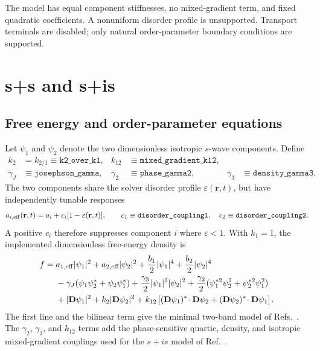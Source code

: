 \documentclass[11pt]{article}
\begin{document}
The model has equal component stiffnesses, no mixed-gradient term, and fixed
quadratic coefficients.  A nonuniform disorder profile is unsupported.
Transport terminals are disabled; only natural order-parameter boundary
conditions are supported.

\section{s+s and s+is \cite{Zhitomirsky2004,Kogan2011,Lin2016}}

\subsection{Free energy and order-parameter equations}

Let $\psi_1$ and $\psi_2$ denote the two dimensionless isotropic $s$-wave
components.  Define
\begin{align}
  k_2&=k_{2/1}\equiv\texttt{k2\_over\_k1},&
  k_{12}&\equiv\texttt{mixed\_gradient\_k12},\\
  \gamma_J&\equiv\texttt{josephson\_gamma},&
  \gamma_2&\equiv\texttt{phase\_gamma2},&
  \gamma_3&\equiv\texttt{density\_gamma3}.
\end{align}
The two components share the solver disorder profile $\varepsilon(\mathbf r,t)$,
but have independently tunable responses
\begin{equation}
  a_{i,{\rm eff}}(\mathbf r,t)
    =a_i+c_i[1-\varepsilon(\mathbf r,t)],
  \qquad
  c_1\equiv\texttt{disorder\_coupling1},\quad
  c_2\equiv\texttt{disorder\_coupling2}.
  \label{eq:ss-disorder}
\end{equation}
A positive $c_i$ therefore suppresses component $i$ where $\varepsilon<1$.
With $k_1=1$, the implemented dimensionless free-energy density is
\begin{align}
  f={}&a_{1,{\rm eff}}|\psi_1|^2+a_{2,{\rm eff}}|\psi_2|^2
    +\frac{b_1}{2}|\psi_1|^4+\frac{b_2}{2}|\psi_2|^4\\
  &-\gamma_J(\psi_1\psi_2^*+\psi_2\psi_1^*)
    +\frac{\gamma_3}{2}|\psi_1|^2|\psi_2|^2
    +\frac{\gamma_2}{2}
       (\psi_1^{*2}\psi_2^2+\psi_2^{*2}\psi_1^2)\\
  &+|\mathbf D\psi_1|^2+k_2|\mathbf D\psi_2|^2
    +k_{12}\left[(\mathbf D\psi_1)^*\!\cdot\mathbf D\psi_2
                  +(\mathbf D\psi_2)^*\!\cdot\mathbf D\psi_1\right].
    \label{eq:ss-free-energy}
\end{align}
The first line and the bilinear term give the minimal two-band model of
Refs.~\cite{Zhitomirsky2004,Kogan2011}.  The $\gamma_2$, $\gamma_3$, and
$k_{12}$ terms add the phase-sensitive quartic, density, and isotropic
mixed-gradient couplings used for the $s+is$ model of Ref.~\cite{Lin2016}.
\end{document}

